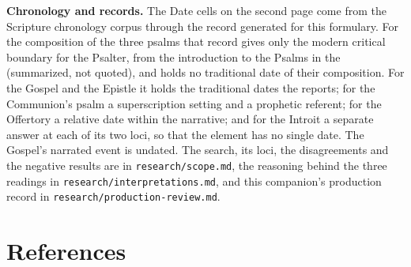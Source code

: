 {\textbf{Chronology and records.} The Date cells on the second page come from
the Scripture chronology corpus through the record generated for this
formulary. For the composition of the three psalms that record gives only the
modern critical boundary for the Psalter, from the introduction to the Psalms in
the  (summarized, not quoted), and
holds no traditional date of their composition. For the Gospel and the Epistle it holds the traditional dates the
 reports; for the Communion's psalm a superscription
setting and a prophetic referent; for the Offertory a relative date within the
narrative; and for the Introit a separate answer at each of its two loci, so
that the element has no single date. The Gospel's narrated event is undated.
The search, its loci, the disagreements and the negative results are in
\texttt{research/scope.md}, the reasoning behind the three readings in
\texttt{research/interpretations.md}, and this companion's production record in
\texttt{research/production-review.md}.
\par}

\section*{References}

